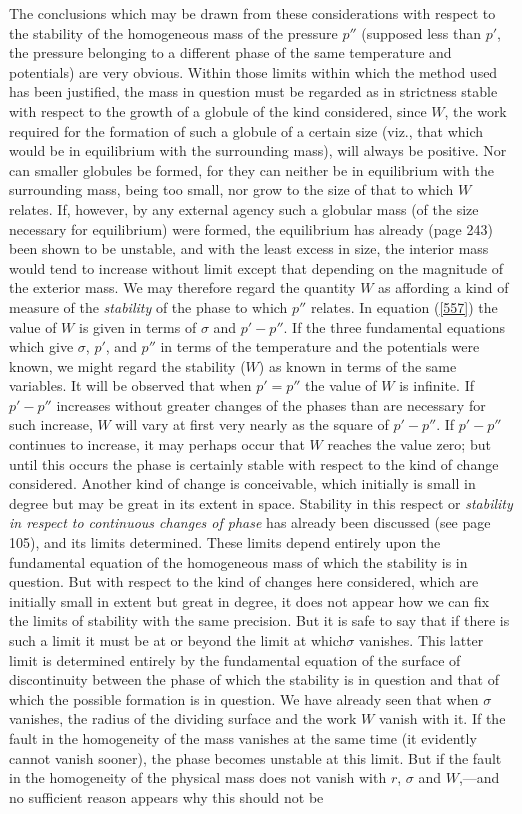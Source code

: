 \documentclass[12pt]{article}
\begin{document}
{The conclusions which may be drawn from these considerations with respect to the stability of the homogeneous mass of the pressure $p''$ (supposed less than $p'$, the pressure belonging to a different phase of the same temperature and potentials) are very obvious. Within those limits within which the method used has been justified, the mass in question must be regarded as in strictness stable with respect to the growth of a globule of the kind considered, since $W$, the work required for the formation of such a globule of a certain size (viz., that which would be in equilibrium with the surrounding mass), will always be positive. 
Nor can smaller globules be formed, for they can neither be in equilibrium with the surrounding mass, being too small, nor grow to the size of that to which $W$ relates. If, however, by any external agency such a globular mass (of the size necessary for equilibrium) were formed, the equilibrium has already (page 243) been shown to be unstable, and with the least excess in size, the interior mass would tend to increase without limit except that depending on the magnitude of the exterior mass. We may therefore regard the quantity $W$ as affording a kind of measure of the \textit{stability} of the phase to which $p''$ relates. In equation (\ref{557}) the value of $W$ is given in terms of $\sigma$ and $p'-p''$. If the three fundamental equations which give $\sigma$, $p'$, and $p''$ in terms of the temperature and the potentials were known, we might regard the stability ($W$) as known in terms of the same variables. It will be observed that when $p'=p''$ the value of $W$ is infinite. If $p'-p''$ increases without greater changes of the phases than are necessary for such increase, $W$ will vary at first very nearly as the square of $p'-p''$. If $p'-p''$ continues to increase, it may perhaps occur that $W$ reaches the value zero; but until this occurs the phase is certainly stable with respect to the kind of change considered. Another kind of change is conceivable, which initially is small in degree but may be great in its extent in space. Stability in this respect or \emph{stability in respect to continuous changes of phase} has already been discussed (see page 105), and its limits determined. These limits depend entirely upon the fundamental equation of the homogeneous mass of which the stability is in question. But with respect to the kind of changes here considered, which are initially small in extent but great in degree, it does not appear how we can fix the limits of stability with the same precision. But it is safe to say that if there is such a limit it must be at or beyond the limit at which$\sigma$ vanishes. This latter limit is determined entirely by the fundamental equation of the surface of discontinuity between the phase of which the stability is in question and that of which the possible formation is in question. We have already seen that when $\sigma$ vanishes, the radius of the dividing surface and the work $W$ vanish with it. If the fault in the homogeneity of the mass vanishes at the same time (it evidently cannot vanish sooner), the phase becomes unstable at this limit. But if the fault in the homogeneity of the physical mass does not vanish with $r$, $\sigma$ and $W$,---and no sufficient reason appears why this should not be }
\end{document}
